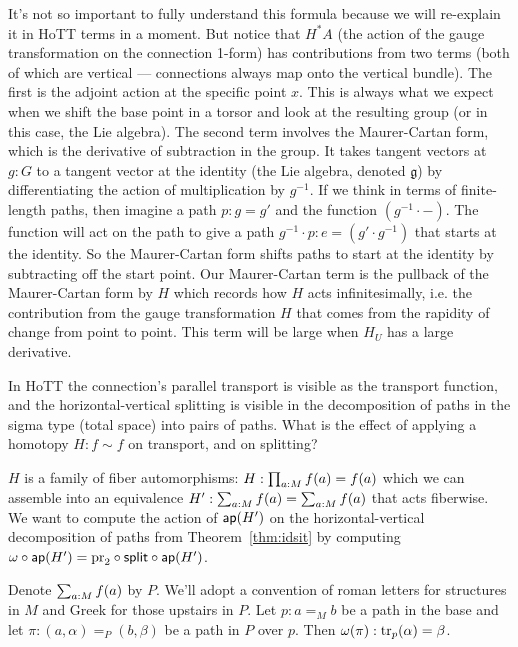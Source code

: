 It's not so important to fully understand this formula because we will re-explain it in HoTT terms in a moment. But notice that \( H^*A \) (the action of the gauge transformation on the connection 1-form) has contributions from two terms (both of which are vertical --- connections always map onto the vertical bundle). The first is the adjoint action at the specific point \( x \). This is always what we expect when we shift the base point in a torsor and look at the resulting group (or in this case, the Lie algebra). The second term involves the Maurer-Cartan form, which is the derivative of subtraction in the group. It takes tangent vectors at \( g:G \) to a tangent vector at the identity (the Lie algebra, denoted \( \mathfrak{g} \)) by differentiating the action of multiplication by \( g^{-1} \). If we think in terms of finite-length paths, then imagine a path \( p:g=g' \) and the function \( (g^{-1}\cdot -) \). The function will act on the path to give a path \( g^{-1}\cdot p:e=(g'\cdot g^{-1}) \) that starts at the identity. So the Maurer-Cartan form shifts paths to start at the identity by subtracting off the start point. Our Maurer-Cartan term is the pullback of the Maurer-Cartan form by \( H \) which records how \( H \) acts infinitesimally, i.e. the contribution from the gauge transformation \( H \) that comes from the rapidity of change from point to point. This term will be large when \( H_U \) has a large derivative.

In HoTT the connection's parallel transport is visible as the transport function, and the horizontal-vertical splitting is visible in the decomposition of paths in the sigma type (total space) into pairs of paths. What is the effect of applying a homotopy \( H:f\sim f \) on transport, and on splitting?

\( H \) is a family of fiber automorphisms: \( H:\prod_{a:M}f(a)=f(a) \) which we can assemble into an equivalence \( H':\sum_{a:M}f(a)=\sum_{a:M}f(a) \) that acts fiberwise. We want to compute the action of \( \mathsf{ap}(H') \) on the horizontal-vertical decomposition of paths from Theorem~\ref{thm:idsit} by computing \( \omega\circ\mathsf{ap}(H')=\mathrm{pr}_2\circ\mathsf{split}\circ\mathsf{ap}(H') \).

Denote \( \sum_{a:M}f(a) \) by \( P \). We'll adopt a convention of roman letters for structures in \( M \) and Greek for those upstairs in \( P \). Let \( p:a=_M b \) be a path in the base and let \( \pi:(a,\alpha)=_P (b,\beta) \) be a path in \( P \) over \( p \). Then \( \omega(\pi):\mathrm{tr}_p(\alpha)=\beta \).

